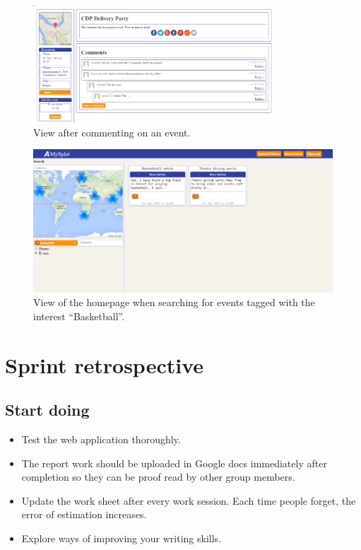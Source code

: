\begin{figure}[ht!]
  \centering
  \includegraphics[width=90mm]{Sprint5/img/test6.png}
  \caption{View after commenting on an event. }
  \label{fig:S5TestAfterComment}
\end{figure}

\begin{figure}[ht!]
  \centering
  \includegraphics[width=\linewidth]{Sprint5/img/test7.png}
  \caption{View of the homepage when searching for events tagged with the interest ``Basketball''. }
  \label{fig:S5TestAfterComment}
\end{figure}

\newpage
\section{Sprint retrospective}
\label{sec:S5Retrospective}


\subsection{Start doing}
\label{subsec:S5RetrospectiveStart}

\begin{itemize}
  \item Test the web application thoroughly.
  \item The report work should be uploaded in Google docs immediately after completion so they can be proof read by other group members.
  \item Update the work sheet after every work session. Each time people forget, the error of estimation increases. 
  \item Explore ways of improving your writing skills. 
\end{itemize}

